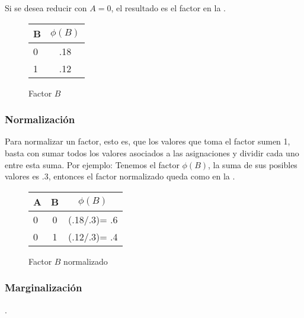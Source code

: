\noindent Si se desea reducir con $A = 0$, el resultado es el factor en la .

\begin{figure}[h]
  \begin{center}
    \begin{tabular}{ l | c }
      B & \(\phi(B)\)\\ \hline
      0 & .18  \\ \hline
      1 & .12  \\
    \end{tabular}
  \end{center}
  \caption{Factor \(B\)}
  \label{fig:FactorA0B}
\end{figure}

\subsubsection{Normalización}
Para normalizar un factor, esto es, que los valores que toma el factor sumen 1, basta con sumar todos los valores asociados a las asignaciones y dividir cada uno entre esta suma. Por ejemplo: Tenemos el factor \(\phi(B)\), la suma de sus posibles valores es .3, entonces el factor normalizado queda como en la .

\begin{figure}[H]
  \begin{center}
    \begin{tabular}{ l  c | c }
      A & B &  \(\phi(B)\)\\ \hline
      0 & 0 & (.18/.3)= .6  \\ \hline
      0 & 1 & (.12/.3)= .4 \\
    \end{tabular}
  \end{center}
  \caption{Factor \(B\) normalizado}
  \label{fig:FactorA0BNorm}
\end{figure}


\subsubsection{Marginalización}
 \parencite[297]{KollerFriedman2009}.

